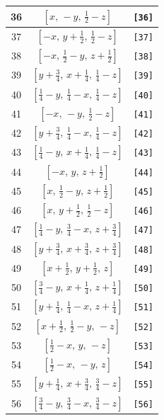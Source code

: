 \documentclass[fleqn,8pt]{jsarticle}
\begin{document}
\begin{longtable}{ccc}
36 & $\left[ x,\, - y,\, \frac{1}{2} - z \right]$ & {\tt [36]} \\ \hline
37 & $\left[ - x,\, y + \frac{1}{2},\, \frac{1}{2} - z \right]$ & {\tt [37]} \\ \hline
38 & $\left[ - x,\, \frac{1}{2} - y,\, z + \frac{1}{2} \right]$ & {\tt [38]} \\ \hline
39 & $\left[ y + \frac{3}{4},\, x + \frac{1}{4},\, \frac{1}{4} - z \right]$ & {\tt [39]} \\ \hline
40 & $\left[ \frac{1}{4} - y,\, \frac{1}{4} - x,\, \frac{1}{4} - z \right]$ & {\tt [40]} \\ \hline
41 & $\left[ - x,\, - y,\, \frac{1}{2} - z \right]$ & {\tt [41]} \\ \hline
42 & $\left[ y + \frac{3}{4},\, \frac{1}{4} - x,\, \frac{1}{4} - z \right]$ & {\tt [42]} \\ \hline
43 & $\left[ \frac{1}{4} - y,\, x + \frac{1}{4},\, \frac{1}{4} - z \right]$ & {\tt [43]} \\ \hline
44 & $\left[ - x,\, y,\, z + \frac{1}{2} \right]$ & {\tt [44]} \\ \hline
45 & $\left[ x,\, \frac{1}{2} - y,\, z + \frac{1}{2} \right]$ & {\tt [45]} \\ \hline
46 & $\left[ x,\, y + \frac{1}{2},\, \frac{1}{2} - z \right]$ & {\tt [46]} \\ \hline
47 & $\left[ \frac{1}{4} - y,\, \frac{3}{4} - x,\, z + \frac{3}{4} \right]$ & {\tt [47]} \\ \hline
48 & $\left[ y + \frac{3}{4},\, x + \frac{3}{4},\, z + \frac{3}{4} \right]$ & {\tt [48]} \\ \hline
49 & $\left[ x + \frac{1}{2},\, y + \frac{1}{2},\, z \right]$ & {\tt [49]} \\ \hline
50 & $\left[ \frac{3}{4} - y,\, x + \frac{1}{4},\, z + \frac{1}{4} \right]$ & {\tt [50]} \\ \hline
51 & $\left[ y + \frac{1}{4},\, \frac{1}{4} - x,\, z + \frac{1}{4} \right]$ & {\tt [51]} \\ \hline
52 & $\left[ x + \frac{1}{2},\, \frac{1}{2} - y,\, - z \right]$ & {\tt [52]} \\ \hline
53 & $\left[ \frac{1}{2} - x,\, y,\, - z \right]$ & {\tt [53]} \\ \hline
54 & $\left[ \frac{1}{2} - x,\, - y,\, z \right]$ & {\tt [54]} \\ \hline
55 & $\left[ y + \frac{1}{4},\, x + \frac{3}{4},\, \frac{3}{4} - z \right]$ & {\tt [55]} \\ \hline
56 & $\left[ \frac{3}{4} - y,\, \frac{3}{4} - x,\, \frac{3}{4} - z \right]$ & {\tt [56]} \\ \hline

\end{longtable}
\end{document}
